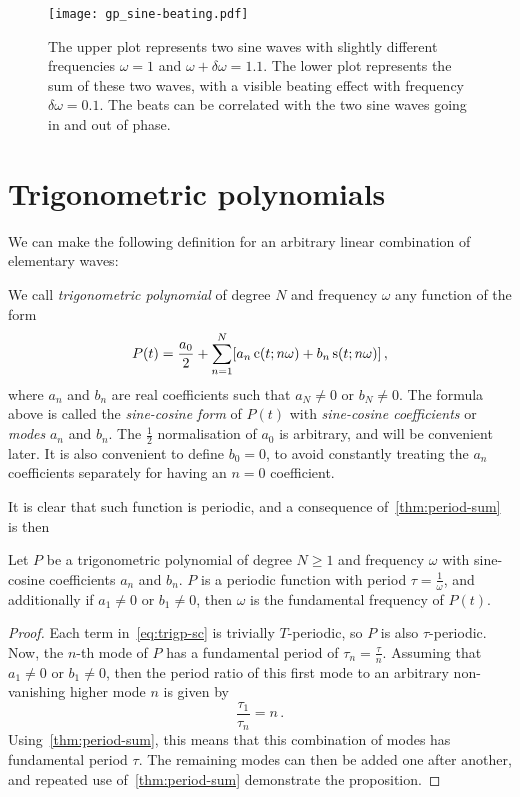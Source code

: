 \begin{figure}
  \centering
  \texttt{[image: gp\_sine-beating.pdf]}
  \caption{The upper plot represents two sine waves with slightly different frequencies
    $\omega=1$ and $\omega+\delta\omega=1.1$. The lower plot represents the sum of these
    two waves, with a visible beating effect with frequency $\delta\omega=0.1$. The beats
  can be correlated with the two sine waves going in and out of phase.}
  \label{fig:beating}
\end{figure}
\section{Trigonometric polynomials}
We can make the following definition for an arbitrary linear combination of elementary
waves:
\begin{definition}
  We call \emph{trigonometric polynomial} of degree $N$ and frequency $\omega$ any
  function of the form
  \begin{equation}
    P(t)=\frac{a_0}{2}+\sum_{n=1}^N[a_n\operatorname{c}(t;n\omega)+b_n\operatorname{s}(t;n\omega)]\,,
    \label{eq:trigp-sc}
  \end{equation}
  where $a_n$ and $b_n$ are real coefficients such that $a_N\neq 0$ or $b_N \neq 0$. The
  formula above is called the \emph{sine-cosine form} of $P(t)$ with \emph{sine-cosine
  coefficients} or \emph{modes} $a_n$ and $b_n$. The $\frac{1}{2}$ normalisation of $a_0$
  is arbitrary, and will be convenient later. It is also convenient to define $b_0=0$, to
  avoid constantly treating the $a_n$ coefficients separately for having an $n=0$
  coefficient.
\end{definition}
It is clear that such function is periodic, and a consequence of~\cref{thm:period-sum} is
then
\begin{proposition}
  Let $P$ be a trigonometric polynomial of degree $N\geq 1$ and frequency $\omega$ with
  sine-cosine coefficients $a_n$ and $b_n$. $P$ is a periodic function with period
  $\tau=\frac{1}{\omega}$, and additionally if $a_1\neq0$ or $b_1\neq0$, then $\omega$ is
  the fundamental frequency of $P(t)$.
\end{proposition}
\begin{proof}
  Each term in~\cref{eq:trigp-sc} is trivially $T$-periodic, so $P$ is also
  $\tau$-periodic. Now, the $n$-th mode of $P$ has a fundamental period of
  $\tau_n=\frac{\tau}{n}$. Assuming that $a_1\neq0$ or $b_1\neq0$, then the period ratio
  of this first mode to an arbitrary non-vanishing higher mode $n$ is given by
  \begin{equation}
    \frac{\tau_1}{\tau_n}=n\,.
  \end{equation}
  Using~\cref{thm:period-sum}, this means that this combination of modes has fundamental
  period $\tau$. The remaining modes can then be added one after another, and repeated use
  of~\cref{thm:period-sum} demonstrate the proposition.
\end{proof}
